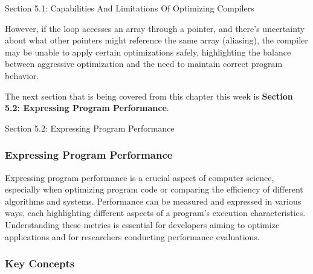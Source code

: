 \begin{notes}{Section 5.1: Capabilities And Limitations Of Optimizing Compilers}
\begin{highlight}
        However, if the loop accesses an array through a pointer, and there's uncertainty about what other pointers might reference the same array (aliasing), the compiler may be unable to apply certain 
        optimizations safely, highlighting the balance between aggressive optimization and the need to maintain correct program behavior.
    \end{highlight}    
\end{notes}

The next section that is being covered from this chapter this week is \textbf{Section 5.2: Expressing Program Performance}.

\begin{notes}{Section 5.2: Expressing Program Performance}
    \subsubsection*{Expressing Program Performance}

    Expressing program performance is a crucial aspect of computer science, especially when optimizing program code or comparing the efficiency of different algorithms and systems. Performance can be 
    measured and expressed in various ways, each highlighting different aspects of a program's execution characteristics. Understanding these metrics is essential for developers aiming to optimize 
    applications and for researchers conducting performance evaluations. \vspace*{1em}
    
    \subsubsection*{Key Concepts}
    

\end{notes}
